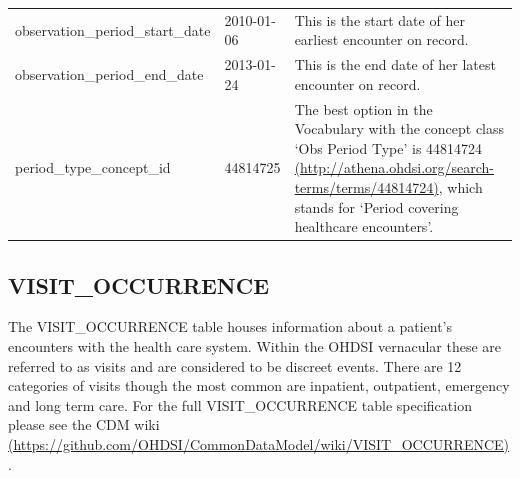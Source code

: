 \documentclass[]{book}
\begin{document}
\begin{longtable}[]{@{}lll@{}}
\begin{minipage}[t]{0.33\columnwidth}
observation\_period\_start\_date\strut
\end{minipage} & \begin{minipage}[t]{0.16\columnwidth}\raggedright\strut
2010-01-06\strut
\end{minipage} & \begin{minipage}[t]{0.42\columnwidth}\raggedright\strut
This is the start date of her earliest encounter on record.\strut
\end{minipage}\tabularnewline
\begin{minipage}[t]{0.33\columnwidth}\raggedright\strut
observation\_period\_end\_date\strut
\end{minipage} & \begin{minipage}[t]{0.16\columnwidth}\raggedright\strut
2013-01-24\strut
\end{minipage} & \begin{minipage}[t]{0.42\columnwidth}\raggedright\strut
This is the end date of her latest encounter on record.\strut
\end{minipage}\tabularnewline
\begin{minipage}[t]{0.33\columnwidth}\raggedright\strut
period\_type\_concept\_id\strut
\end{minipage} & \begin{minipage}[t]{0.16\columnwidth}\raggedright\strut
44814725\strut
\end{minipage} & \begin{minipage}[t]{0.42\columnwidth}\raggedright\strut
The best option in the Vocabulary with the concept class `Obs Period
Type' is 44814724
\href{http://athena.ohdsi.org/search-terms/terms/44814724}{(http://athena.ohdsi.org/search-terms/terms/44814724)},
which stands for `Period covering healthcare encounters'.\strut
\end{minipage}\tabularnewline
\bottomrule
\end{longtable}

\subsection{VISIT\_OCCURRENCE}\label{visitOccurrence}

The VISIT\_OCCURRENCE table houses information about a patient's
encounters with the health care system. Within the OHDSI vernacular
these are referred to as visits and are considered to be discreet
events. There are 12 categories of visits though the most common are
inpatient, outpatient, emergency and long term care. For the full
VISIT\_OCCURRENCE table specification please see the CDM wiki
\href{https://github.com/OHDSI/CommonDataModel/wiki/VISIT_OCCURRENCE}{(https://github.com/OHDSI/CommonDataModel/wiki/VISIT\_OCCURRENCE)}.
\end{document}
